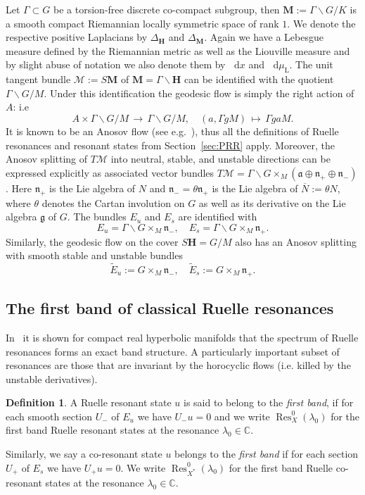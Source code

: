 \documentclass[10pt]{amsart}
\theoremstyle{definition}
\newtheorem{defi}[cdrthm]{Definition}
\DeclareMathOperator{\Res}{Res}
\newcommand{\rml}{\mathrm{L}}
\newcommand{\mc}{\mathcal}
\newcommand{\cc}{\mathbb{C}}
\newcommand{\bfh}{\mathbf{H}}
\newcommand{\bfm}{\mathbf{M}}
\newcommand{\x}{\times}
\newcommand{\til}{\widetilde}
\newcommand{\intd}{\mathop{}\!\mathrm{d}}
\begin{document}
Let $\Gamma\subset G$ be a torsion-free discrete co-compact subgroup, then $\textbf{M}:=\Gamma\backslash G/K$ is a smooth compact Riemannian locally symmetric space of rank $1$. We denote the respective positive Laplacians by $\Delta_{\mathbf{H}}$ and $\Delta_{\textbf{M}}$. Again we have a Lebesgue measure defined by the Riemannian metric as well as the Liouville measure and by slight abuse of notation we also denote them by $\intd x$ and $\intd \mu_{\rml}$. The unit tangent bundle $\mc{M}:=S{\bfm}$ of ${\bfm}=\Gamma\backslash {\bfh}$ can be identified with the quotient $\Gamma\backslash G/M$. Under this identification the geodesic flow is simply the right action of $A$: i.e
\[
A \x \Gamma\backslash G/M\,\to\,\Gamma\backslash G/M, \quad (a, \Gamma gM)\,\mapsto\,\Gamma gaM.
\]
It is known to be an Anosov flow (see e.g.~\cite{Hi05}), thus all the definitions of Ruelle resonances and resonant states from Section~\ref{sec:PRR} apply. Moreover, the Anosov splitting of $T\mc{M}$ into neutral, stable, and unstable directions can be expressed explicitly as associated vector bundles $T\mc{M}=\Gamma\backslash G\times_M(\mathfrak a\oplus\mathfrak n_+\oplus \mathfrak n_-)$. Here $\mathfrak n_+$ is the Lie algebra of $N$ and $\mathfrak n_-=\theta\mathfrak n_+$ is the Lie algebra of $\overline{N}:=\theta N$, where $\theta$ denotes the Cartan involution on $G$ as well as its derivative on the Lie algebra $\mathfrak g$ of $G$. The bundles $E_u$ and $E_s$ are identified with
\[
E_u=\Gamma\backslash G\times_M \mathfrak n_-, \quad E_s=\Gamma\backslash G\times_M \mathfrak n_+.
\]
Similarly, the geodesic flow on the cover $S{\bfh}=G/M$ also has an Anosov splitting with smooth stable and unstable bundles
\[
\til{E}_u:=G\times_M \mathfrak n_-, \quad \til{E}_s:=G\times_M \mathfrak n_+.
\]

\subsection{The first band of classical Ruelle resonances}\label{sec:firstband}
In~\cite{DFG15} it is shown for compact real hyperbolic manifolds that the spectrum of Ruelle resonances forms an exact band structure. A particularly important subset of resonances are those that are invariant by the horocyclic flows (i.e. killed by the unstable derivatives).

\begin{defi}\label{def:firstBand}
A Ruelle resonant state $u$ is said to belong to the
\emph{first band}, if for each smooth section $U_-$ of $E_u$ we have $U_- u =0$ and we write ${\Res}_X^0(\lambda_0)$ for the first band Ruelle resonant states at the resonance $\lambda_0\in \cc$.

Similarly, we say a co-resonant state $u$ belongs to the
\emph{first band} if for each section $U_+$ of $E_s$ we have $U_+u =0$. We write $ \Res^0_{X^*}(\lambda_0)$ for the first band Ruelle co-resonant states at the resonance $\lambda_0\in \cc$.
\end{defi}
\end{document}
